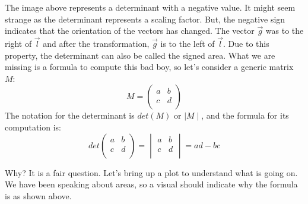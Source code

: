 \documentclass[a4,12pt,twosided,openany]{memoir}
\begin{document}
\par 
\indent
The image above represents a determinant with a negative value. It might seem strange as the determinant represents a scaling factor. But, the negative sign indicates  that the orientation of the vectors has changed. The vector $\overrightarrow{g}$ was to the right of $\overrightarrow{l}$ and after the transformation, $\overrightarrow{g}$ is to the left of $\overrightarrow{l}$. Due to this property, the determinant can also be called the signed area. What we are missing is a formula to compute this bad boy, so let’s consider a generic matrix $M$:
\[M = \begin{pmatrix}
a & b   \\
c & d \\
\end{pmatrix}
\]
The notation for the determinant is $det(M)$ or $\mid M \mid$, and the formula for its computation is:
\begin{equation} \label{eq:det}
det \begin{pmatrix}
a & b   \\
c & d \\
\end{pmatrix} = \begin{vmatrix}
a & b   \\
c & d \\
\end{vmatrix} = ad-bc
\end{equation}
\par 
\indent
Why? It is a fair question. Let’s bring up a plot to understand what is going on. We have been speaking about areas, so a visual should indicate why the formula is as shown above.
\newpage
\end{document}
